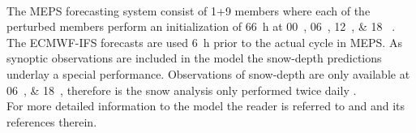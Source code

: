 \\
The MEPS forecasting system consist of 1+9 members where each of the perturbed members perform an initialization of \SI{66}{\hour} at \SIlist{00;06;12;18}{\UTC} \citep{wiki_description_2017}. The ECMWF-IFS forecasts are used \SI{6}{\hour} prior to the actual cycle in MEPS. As synoptic observations are included in the model the snow-depth predictions underlay a special performance. Observations of snow-depth are only available at \SIlist{06;18}{\UTC}, therefore is the snow analysis only performed twice daily \citep{muller_arome-metcoop:_2017, homleid_verification_2016}. 
\\
For more detailed information to the model the reader is referred to \cite{muller_arome-metcoop:_2017} and \cite{wiki_description_2017} and its references therein.

